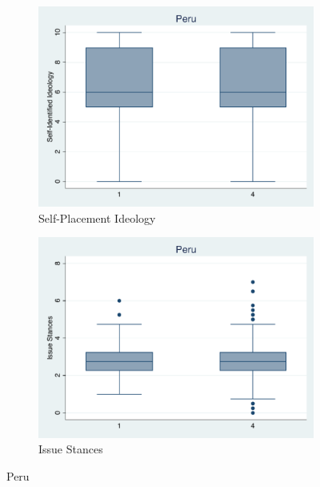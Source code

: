 \documentclass[12pt, titlepage]{article}
\begin{document}
\begin{figure}[H]
	\centering
	\begin{subfigure}[b]{0.475\textwidth}   
		\centering 
		\includegraphics[width=\textwidth]{IdeoBP/Peru}
		\caption{Self-Placement Ideology}
	\end{subfigure}
	\hfill
	\begin{subfigure}[b]{0.475\textwidth}
		\centering 
		\includegraphics[width=\textwidth]{BoxLib/Peru}
		\caption{Issue Stances}
	\end{subfigure}
	\caption{Peru}
	\label{Peru}
\end{figure}
\end{document}
